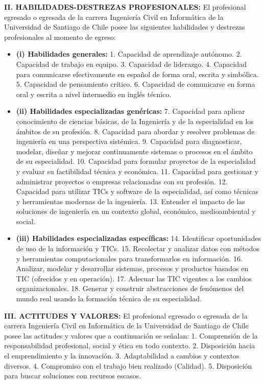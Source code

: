 \documentclass[11pt,a4paper]{article}
\begin{document}
\begin{tcolorbox}[fichaStyle, title={UNIVERSIDAD 02: Universidad de Santiago de Chile (USACH) --- Civil}]
{\vspace{4pt}\noindent\textbf{II. HABILIDADES-DESTREZAS PROFESIONALES:}
El profesional egresado o egresada de la carrera Ingeniería Civil en Informática de la Universidad de Santiago de Chile posee las siguientes habilidades y destrezas profesionales al momento de egreso:
\begin{itemize}[noitemsep, leftmargin=*]
    \item \textbf{(i) Habilidades generales:} 1. Capacidad de aprendizaje autónomo. 2. Capacidad de trabajo en equipo. 3. Capacidad de liderazgo. 4. Capacidad para comunicarse efectivamente en español de forma oral, escrita y simbólica. 5. Capacidad de pensamiento crítico. 6. Capacidad de comunicarse en forma oral y escrita a nivel intermedio en inglés técnico.
    \item \textbf{(ii) Habilidades especializadas genéricas:} 7. Capacidad para aplicar conocimiento de ciencias básicas, de la Ingeniería y de la especialidad en los ámbitos de su profesión. 8. Capacidad para abordar y resolver problemas de ingeniería en una perspectiva sistémica. 9. Capacidad para diagnosticar, modelar, diseñar y mejorar continuamente sistemas o procesos en el ámbito de su especialidad. 10. Capacidad para formular proyectos de la especialidad y evaluar su factibilidad técnica y económica. 11. Capacidad para gestionar y administrar proyectos o empresas relacionadas con su profesión. 12. Capacidad para utilizar TICs y software de la especialidad, así como técnicas y herramientas modernas de la ingeniería. 13. Entender el impacto de las soluciones de ingeniería en un contexto global, económico, medioambiental y social.
    \item \textbf{(iii) Habilidades especializadas específicas:} 14. Identificar oportunidades de uso de la información y TICs. 15. Recolectar y analizar datos con métodos y herramientas computacionales para transformarlos en información. 16. Analizar, modelar y desarrollar sistemas, procesos y productos basados en TIC (ofrecidos y en operación). 17. Adecuar las TIC vigentes a los cambios organizacionales. 18. Generar y construir abstracciones de fenómenos del mundo real usando la formación técnica de su especialidad.
\end{itemize}

\vspace{4pt}\noindent\textbf{III. ACTITUDES Y VALORES:}
El profesional egresado o egresada de la carrera Ingeniería Civil en Informática de la Universidad de Santiago de Chile posee las actitudes y valores que a continuación se señalan: 1. Comprensión de la responsabilidad profesional, social y ética en todo contexto. 2. Disposición hacia el emprendimiento y la innovación. 3. Adaptabilidad a cambios y contextos diversos. 4. Compromiso con el trabajo bien realizado (Calidad). 5. Disposición para buscar soluciones con recursos escasos.
}
\end{tcolorbox}
\end{document}

